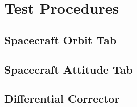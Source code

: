 \chapter{Test Procedures} \label{Ch:TestProcedures}

\section{Spacecraft Orbit Tab}















%
%
%




\clearpage
\section{Spacecraft Attitude Tab}


\clearpage
\section{Differential Corrector}



%

